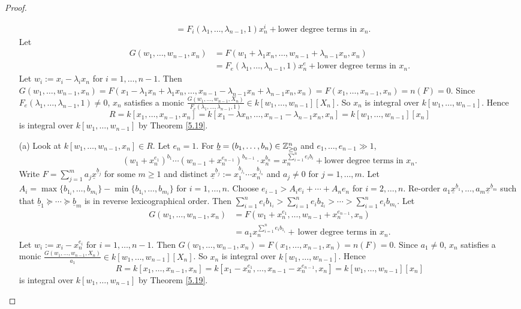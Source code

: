 \begin{proof}
\begin{enumerate}
\begin{align*}
                &= F_i(\lambda_1,\ldots,\lambda_{n-1},1)x_n^{i} + \text{lower degree terms in $x_n$}. 
            \end{align*}
            Let 
            \begin{align*}
                G(w_1,\ldots,w_{n-1},x_n) &= F(w_1+\lambda_1x_n,\ldots,w_{n-1}+\lambda_{n-1}x_n,x_n) \\
                &= F_e(\lambda_1,\ldots,\lambda_{n-1},1)x_n^{e} + \text{lower degree terms in $x_n$}. 
            \end{align*}
            Let $w_i := x_i-\lambda_ix_n$ for $i = 1,\ldots,n-1$. Then $G(w_1,\ldots,w_{n-1},x_n) = F(x_1-\lambda_1x_n+\lambda_1x_n,\ldots,x_{n-1}-\lambda_{n-1}x_n + \lambda_{n-1}x_n,x_n) = F(x_1,\ldots,x_{n-1},x_n) = n(F) = 0$. Since $F_e(\lambda_1,\ldots,\lambda_{n-1},1) \neq 0$, $x_n$ satisfies a monic $\frac{G(w_1,\ldots,w_{n-1},X_n)}{F_e(\lambda_1,\ldots,\lambda_{n-1},1)} \in k[w_1,\ldots,w_{n-1}][X_n]$. So $x_n$ is integral over $k[w_1,\ldots,w_{n-1}]$. Hence 
            \[R = k[x_1,\ldots,x_{n-1},x_n] = k[x_1-\lambda x_n,\ldots,x_{n-1}-\lambda_{n-1}x_n,x_n] = k[w_1,\ldots,w_{n-1}][x_n]\] 
            is integral over $k[w_1,\ldots,w_{n-1}]$ by Theorem \ref{5.19}.
        \item[(a)]   
            Look at $k[w_1,\ldots,w_{n-1},x_n] \in R$. Let $e_n = 1$. For $\underline b = (b_1,\ldots,b_n) \in \mathbb{Z}_{\geq 0}^{n}$ and $e_1,\ldots,e_{n-1} \gg 1$, 
            \[(w_1+x_n^{e_1})^{b_1} \cdots (w_{n-1} + x_n^{e_{n-1}})^{b_{n-1}} \cdot x_n^{b_n} = x_n^{\sum_{i=1}^{n}e_ib_i} + \text{lower degree terms in $x_n$}.\]
            Write $F = \sum_{j=1}^{m} a_j \underline x^{\underline b_j}$ for some $m \geq 1$ and distinct $\underline x^{\underline b_j} := x_1^{b_{j_1}} \cdots x_n^{b_{j_n}}$ and $a_j \neq 0$ for $j = 1,\ldots,m$. Let $A_i = \max\{b_{1_i},\ldots,b_{m_i}\} - \min\{b_{1_i},\ldots,b_{m_i}\}$ for $i = 1,\ldots,n$. Choose $e_{i-1} > A_ie_i + \cdots + A_ne_n$ for $i = 2,\ldots,n$. Re-order $a_1 \underline x^{\underline b_1},\ldots,a_m \underline x^{\underline b_m}$ such that $\underline b_1 \succcurlyeq \cdots \succcurlyeq \underline b_m$ is in reverse lexicographical order. Then $\sum_{i=1}^{n}e_ib_{1_i} > \sum_{i=1}^{n} e_ib_{2_i} > \cdots > \sum_{i=1}^{n} e_ib_{m_i}$. Let 
            \begin{align*}
                G(w_1,\ldots,w_{n-1},x_n) &= F(w_1+x_n^{e_1},\ldots,w_{n-1}+x_n^{e_{n-1}},x_n) \\
                &= a_1x_n^{\sum_{i=1}^{n}e_ib_{1_i}}+\, \text{lower degree terms in }x_n.
            \end{align*}
             Let $w_i := x_i-x_n^{e_i}$ for $i = 1,\ldots,n-1$. Then $G(w_1,\ldots,w_{n-1},x_n) = F(x_1,\ldots,x_{n-1},x_n) = n(F) = 0$. Since $a_1 \neq 0$, $x_n$ satisfies a monic $\frac{G(w_1,\ldots,w_{n-1},X_n)}{a_1} \in k[w_1,\ldots,w_{n-1}][X_n]$. So $x_n$ is integral over $k[w_1,\ldots,w_{n-1}]$. Hence 
             \[R = k[x_1,\ldots,x_{n-1},x_n] = k[x_1-x_n^{e_1},\ldots,x_{n-1}-x_{n}^{e_{n-1}},x_n] = k[w_1,\ldots,w_{n-1}][x_n]\] 
             is integral over $k[w_1,\ldots,w_{n-1}]$ by Theorem \ref{5.19}. \qedhere
    \end{enumerate}
\end{proof}
